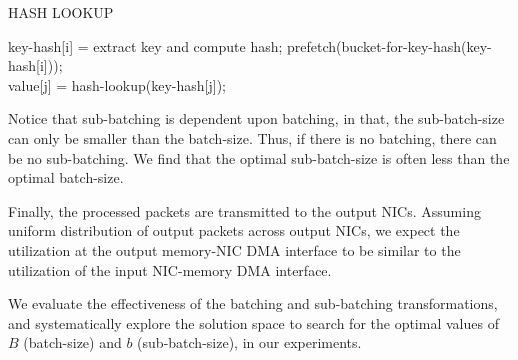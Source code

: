 \begin{algorithm}[H]
 \caption{HASH LOOKUP}
 \label{algo:prefetch}
 \begin{algorithmic}[1]
     \State key-hash[i] = extract key and compute hash; \label{hash-compute-line}
     \State prefetch(bucket-for-key-hash(key-hash[i])); \label{prefetch-line}
 \EndFor
 \\
     \State value[j] = hash-lookup(key-hash[j]); \label{hash-lookup-line}
 \EndFor
 \end{algorithmic}
\end{algorithm}
Notice that sub-batching is dependent upon batching, in that, the sub-batch-size can only be smaller than the batch-size. Thus, if there is no
batching, there can be no sub-batching. We find that the optimal sub-batch-size is often less than the
optimal batch-size.

Finally, the processed packets are transmitted to the output NICs. Assuming uniform distribution of output packets
across output NICs, we expect
the utilization at the output memory-NIC DMA interface to be similar to the utilization of the input NIC-memory DMA
interface.

We evaluate the effectiveness of the batching and sub-batching transformations, and systematically explore
the solution space to search for the optimal values of $B$ (batch-size) and $b$ (sub-batch-size), in our experiments.